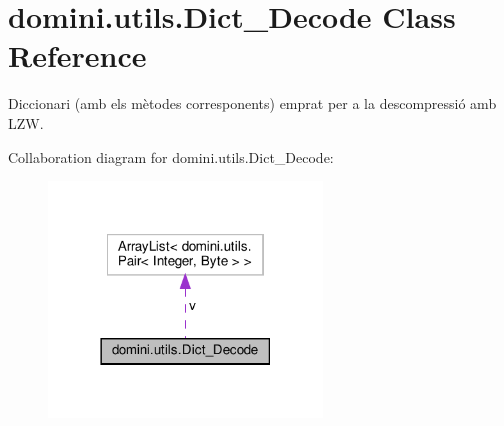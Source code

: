 \hypertarget{classdomini_1_1utils_1_1Dict__Decode}{}\section{domini.\+utils.\+Dict\+\_\+\+Decode Class Reference}
\label{classdomini_1_1utils_1_1Dict__Decode}


Diccionari (amb els mètodes corresponents) emprat per a la descompressió amb L\+ZW.  




Collaboration diagram for domini.\+utils.\+Dict\+\_\+\+Decode\+:\nopagebreak
\begin{figure}[H]
\begin{center}
\leavevmode
\includegraphics[width=206pt]{classdomini_1_1utils_1_1Dict__Decode__coll__graph}
\end{center}
\end{figure}
